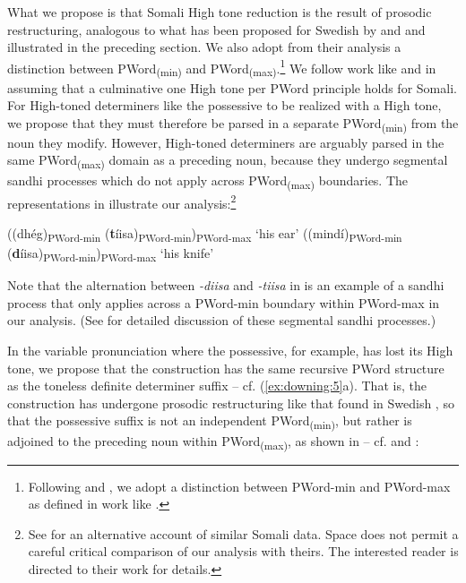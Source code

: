 \documentclass[output=paper]{langscibook}
\begin{document}
What we propose is that Somali High tone reduction is the result of prosodic restructuring, analogous to what has been proposed for Swedish by \citet{Myrberg2015} and \citet{Riad2016} and illustrated in the preceding section. We also adopt from their analysis a distinction between PWord\textsubscript{(min)} and PWord\textsubscript{(max)}.\footnote{Following \citet{Myrberg2015} and \citet{Riad2016}, we adopt a distinction between PWord-min and PWord-max as defined in work like \citet{Ito2012, Ito2013}.} We follow work like \citet{Green2016,Hyman1981,Hyman2006, Hyman2012,LeGac2003} and \citet{Saeed2004} in assuming that a culminative one High tone per PWord principle holds for Somali. For High-toned determiners like the possessive to be realized with a High tone, we propose that they must therefore be parsed in a separate PWord\textsubscript{(min)} from the noun they modify. However, High-toned determiners are arguably parsed in the same PWord\textsubscript{(max)} domain as a preceding noun, because they undergo segmental sandhi processes which do not apply across PWord\textsubscript{(max)} boundaries. The representations in  illustrate our analysis:\footnote{See \citet{Green2016} for an alternative account of similar Somali data. Space does not permit a careful critical comparison of our analysis with theirs. The interested reader is directed to their work for details.}

\ea \label{ex:downing:18}
\ea ((dhég)\textsubscript{PWord-min} (\textbf{t}íisa)\textsubscript{PWord-min})\textsubscript{PWord-max}   ‘his ear’ \label{ex:downing:18a}
\ex ((mindí)\textsubscript{PWord-min} (\textbf{d}íisa)\textsubscript{PWord-min})\textsubscript{PWord-max} ‘his knife’ \label{ex:downing:18b}
\z
\z

Note that the alternation between \textit{-diisa} and \textit{-tiisa} in  is an example of a sandhi process that only applies across a PWord-min boundary within PWord-max in our analysis. (See \citealt[28--31]{Saeed1999} for detailed discussion of these segmental sandhi processes.)

In the variable pronunciation where the possessive, for example, has lost its High tone, we propose that the construction has the same recursive PWord structure as the toneless definite determiner suffix – cf. (\ref{ex:downing:5}a). That is, the construction has undergone prosodic restructuring like that found in Swedish , so that the possessive suffix is not an independent PWord\textsubscript{(min)}, but rather is adjoined to the preceding noun within PWord\textsubscript{(max)}, as shown in  – cf.   and :
\end{document}

